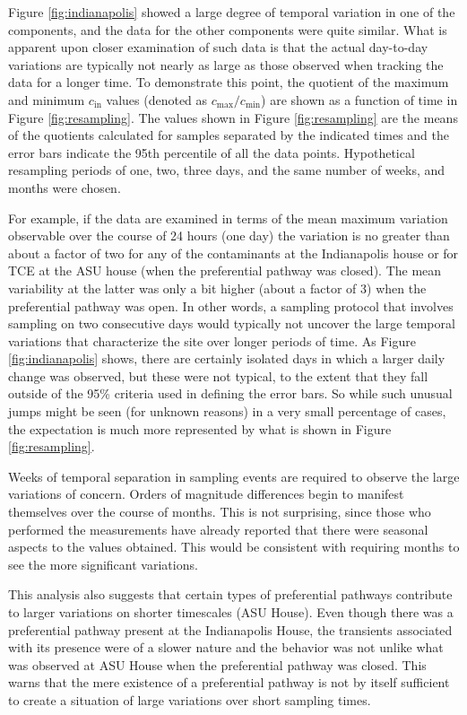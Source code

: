 \documentclass[journal=esthag,manuscript=article]{achemso}
\begin{document}
Figure \ref{fig:indianapolis} showed a large degree of temporal variation in one of the components, and the data for the other components were quite similar.
What is apparent upon closer examination of such data is that the actual day-to-day variations are typically not nearly as large as those observed when tracking the data for a longer time.
To demonstrate this point, the quotient of the maximum and minimum $c_\mathrm{in}$ values (denoted as $c_\mathrm{max}/c_\mathrm{min}$) are shown as a function of time in Figure \ref{fig:resampling}.
The values shown in Figure \ref{fig:resampling} are the means of the quotients calculated for samples separated by the indicated times and the error bars indicate the 95th percentile of all the data points.
Hypothetical resampling periods of one, two, three days, and the same number of weeks, and months were chosen.\par

For example, if the data are examined in terms of the mean maximum variation observable over the course of 24 hours (one day) the variation is no greater than about a factor of two for any of the contaminants at the Indianapolis house or for TCE at the ASU house (when the preferential pathway was closed).
The mean variability at the latter was only a bit higher (about a factor of 3) when the preferential pathway was open.
In other words, a sampling protocol that involves sampling on two consecutive days would typically not uncover the large temporal variations that characterize the site over longer periods of time.
As Figure \ref{fig:indianapolis} shows, there are certainly isolated days in which a larger daily change was observed, but these were not typical, to the extent that they fall outside of the 95\% criteria used in defining the error bars.
So while such unusual jumps might be seen (for unknown reasons) in a very small percentage of cases, the expectation is much more represented by what is shown in Figure \ref{fig:resampling}.\par

Weeks of temporal separation in sampling events are required to observe the large variations of concern.
Orders of magnitude differences begin to manifest themselves over the course of months.
This is not surprising, since those who performed the measurements have already reported that there were seasonal aspects to the values obtained.
This would be consistent with requiring months to see the more significant variations.\par

This analysis also suggests that certain types of preferential pathways contribute to larger variations on shorter timescales (ASU House).
Even though there was a preferential pathway present at the Indianapolis House, the transients associated with its presence were of a slower nature and the behavior was not unlike what was observed at ASU House when the preferential pathway was closed.
This warns that the mere existence of a preferential pathway is not by itself sufficient to create a situation of large variations over short sampling times.\par
\end{document}
